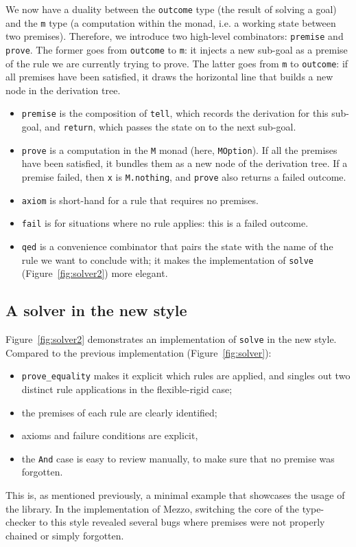 \documentclass{easychair}
\def\li{\lstinline}
\newcommand{\fref}[1]{Figure~\ref{fig:#1}}
\begin{document}
We now have a duality between the \li+outcome+ type (the result of solving a
goal) and the \li+m+ type (a computation within the monad, i.e. a working
state between two premises). Therefore, we introduce two high-level combinators:
\li+premise+ and \li+prove+. The former goes from \li+outcome+ to \li+m+: it
injects a new sub-goal as a premise of the rule we are currently trying to
prove. The latter goes from \li+m+ to \li+outcome+: if all premises have been
satisfied, it draws the horizontal line that builds a new node in the derivation
tree.

\begin{itemize}

  \item \li+premise+ is the composition of \li+tell+, which records the
    derivation for this sub-goal, and \li+return+, which passes the state on to
    the next sub-goal.

  \item \li+prove+ is a computation in the \li+M+ monad (here, \li+MOption+). If
    all the premises have been satisfied, it bundles them as a new node of the
    derivation tree. If a premise failed, then \li+x+ is \li+M.nothing+, and
    \li+prove+ also returns a failed outcome.

  \item \li+axiom+ is short-hand for a rule that requires no premises.

  \item \li+fail+ is for situations where no rule applies: this is a failed outcome.

  \item \li+qed+ is a convenience combinator that pairs the state with the name
    of the rule we want to conclude with; it makes the implementation of
    \li+solve+ (\fref{solver2}) more elegant.

\end{itemize}

\subsection{A solver in the new style}

\fref{solver2} demonstrates an implementation of \li+solve+ in the new style.
Compared to the previous implementation (\fref{solver}):
\begin{itemize}
  \item \li+prove_equality+ makes it explicit which rules are applied, and
    singles out two distinct rule applications in the flexible-rigid case;
  \item the premises of each rule are clearly identified;
  \item axioms and failure conditions are explicit,
  \item the \li+And+ case is easy to review manually, to make sure that no
    premise was forgotten.
\end{itemize}
This is, as mentioned previously, a minimal example that showcases the usage of
the library. In the implementation of Mezzo, switching the core of the
type-checker to this style revealed several bugs where premises were not
properly chained or simply forgotten.
\end{document}
